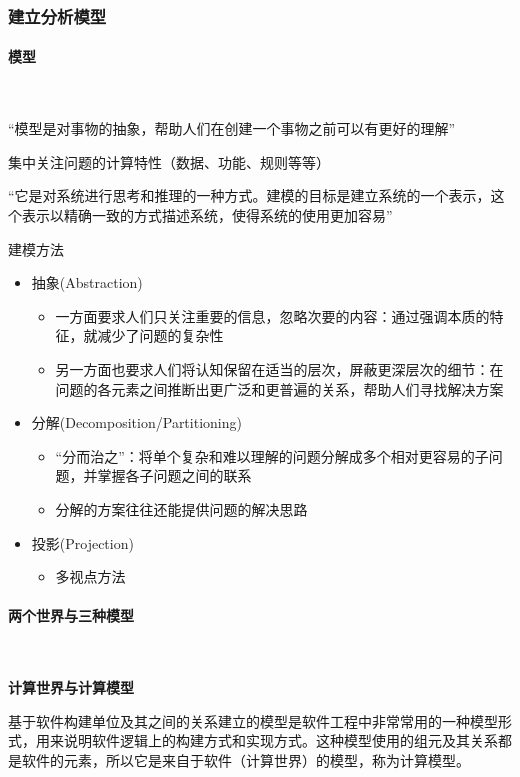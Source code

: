 \subsubsection{建立分析模型}

\paragraph{模型}~{} \par
“模型是对事物的抽象，帮助人们在创建一个事物之前可以有更好的理解” 

集中关注问题的计算特性（数据、功能、规则等等） 

“它是对系统进行思考和推理的一种方式。建模的目标是建立系统的一个表示，这个表示以精确一致的方式描述系统，使得系统的使用更加容易” 

建模方法
\begin{itemize}
    \item 抽象(Abstraction)
    \begin{itemize}
        \item 一方面要求人们只关注重要的信息，忽略次要的内容：通过强调本质的特征，就减少了问题的复杂性
        \item 另一方面也要求人们将认知保留在适当的层次，屏蔽更深层次的细节：在问题的各元素之间推断出更广泛和更普遍的关系，帮助人们寻找解决方案
    \end{itemize}
    \item 分解(Decomposition/Partitioning)
    \begin{itemize}
        \item “分而治之”：将单个复杂和难以理解的问题分解成多个相对更容易的子问题，并掌握各子问题之间的联系
        \item 分解的方案往往还能提供问题的解决思路
    \end{itemize}
    \item 投影(Projection)
    \begin{itemize}
        \item 多视点方法
    \end{itemize}
\end{itemize}

\paragraph{两个世界与三种模型}~{} \par
\textbf{计算世界与计算模型} \par
基于软件构建单位及其之间的关系建立的模型是软件工程中非常常用的一种模型形式，用来说明软件逻辑上的构建方式和实现方式。这种模型使用的组元及其关系都是软件的元素，所以它是来自于软件（计算世界）的模型，称为计算模型。

